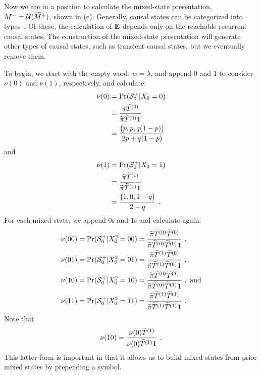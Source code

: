 Now we are in a position to calculate the mixed-state presentation, 
${M}^{-} = \mathcal{U}(\widetilde{M}^+)$, shown  in (c).  Generally,
causal states can be categorized into types~\cite{Uppe97a}. Of these, 
the calculation of ${\bf E}$ depends only on the reachable recurrent causal states.
The construction of the mixed-state presentation will generate other types of
causal states, such as transient causal states, but we eventually remove
them.

To begin, we start with the empty word, $w=\lambda$, and append $0$ and $1$
to consider $\nu(0)$ and $\nu(1)$, respectively, and calculate:
\begin{align*}
\nu(0) 
  &= \Pr({\mathcal{S}}^{+}_0|{X}_0=0)  \\
  & = \frac{\widetilde{\pi} \widetilde{T}^{(0)}}
 	{\widetilde{\pi} \widetilde{T}^{(0)} \mathbf{1}} \\
  &= \frac{\bigl(p, p, q(1-p)\bigr)}{2p + q(1-p)}
\end{align*}
and
\begin{align*}
\nu(1)
  &= \Pr({\mathcal{S}}^{+}_0|{X}_0=1)  \\
  &= \frac{\widetilde{\pi} \widetilde{T}^{(1)}}
  	{\widetilde{\pi} \widetilde{T}^{(1)} \mathbf{1}} \\
  &= \frac{\bigl( 1, 0, 1-q\bigr)}{2-q} ~.
\end{align*}
For each mixed state, we append $0$s and $1$s and calculate again:
\begin{align*}
\nu(00)
&= \Pr({\mathcal{S}}^{+}_0|{X}_0^2=00) 
 = \frac{\widetilde{\pi} \widetilde{T}^{(0)} \widetilde{T}^{(0)}}
        {\widetilde{\pi} \widetilde{T}^{(0)} \widetilde{T}^{(0)} \mathbf{1}} ~,\\
\nu(01)
&= \Pr({\mathcal{S}}^{+}_0|{X}_0^2=01) 
 = \frac{\widetilde{\pi} \widetilde{T}^{(1)} \widetilde{T}^{(0)}}
        {\widetilde{\pi} \widetilde{T}^{(1)} \widetilde{T}^{(0)} \mathbf{1}} ~,\\
\nu(10)
&= \Pr({\mathcal{S}}^{+}_0|{X}_0^2=10) 
 = \frac{\widetilde{\pi} \widetilde{T}^{(0)} \widetilde{T}^{(1)}}
        {\widetilde{\pi} \widetilde{T}^{(0)} \widetilde{T}^{(1)} \mathbf{1}} ~,
		\mathrm{~and} \\
\nu(11)
&= \Pr({\mathcal{S}}^{+}_0|{X}_0^2=11) 
 = \frac{\widetilde{\pi} \widetilde{T}^{(1)} \widetilde{T}^{(1)}}
        {\widetilde{\pi} \widetilde{T}^{(1)} \widetilde{T}^{(1)} \mathbf{1} }~.
\end{align*}
Note that 
\begin{equation}
\nu(10)
  = \frac{\nu(0)\widetilde{T}^{(1)}}{\nu(0) \widetilde{T}^{(1)}\mathbf{1}} ~.
\end{equation}
This latter form is important in that it allows us to build mixed states from
prior mixed states by prepending a symbol. 

